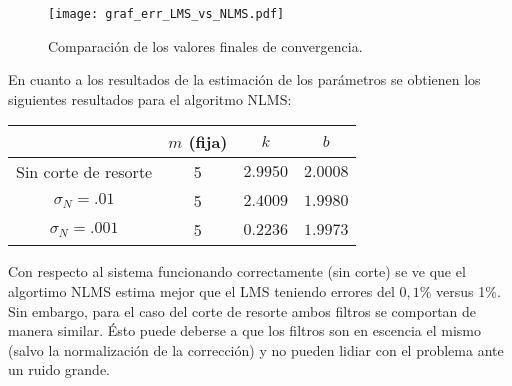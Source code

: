 	\begin{figure}[h!]
		\centering
		\texttt{[image: graf\_err\_LMS\_vs\_NLMS.pdf]}
		\caption{Comparación de los valores finales de convergencia.}
		\label{fig:ej5_err}
	\end{figure}


	En cuanto a los resultados de la estimación de los parámetros se obtienen los siguientes resultados para el algoritmo NLMS:
		\begin{table}[h!]
			\centering
			\begin{tabular}{cccc}
				\toprule
				&$m$ (fija)	& $k$	& $b$\\
				\midrule
				Sin corte de resorte&5&$\num{2.9950}$&$\num{2.0008}$\\
				$\sigma_N=\num{.01}$&5&$\num{2.4009}$&$\num{1.9980}$\\
				$\sigma_N=\num{.001}$&5&$\num{0.2236}$&$\num{1.9973}$\\
				\bottomrule
			\end{tabular}
		\end{table}

	Con respecto al sistema funcionando correctamente (sin corte) se ve que el algortimo NLMS estima mejor que el LMS teniendo errores del $0,1$\% versus 1\%. Sin embargo, para el caso del corte de resorte ambos filtros se comportan de manera similar. Ésto puede deberse a que los filtros son en escencia el mismo (salvo la normalización de la corrección) y no pueden lidiar con el problema ante un ruido grande.
